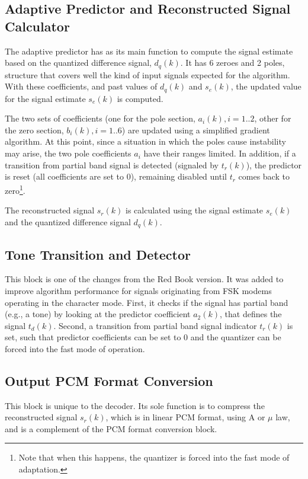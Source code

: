 \subsection{Adaptive Predictor and Reconstructed Signal Calculator}

The adaptive predictor has as its main function to compute the signal
estimate based on the quantized difference signal, $d_q(k)$. It has 6
zeroes and 2 poles, structure that covers well the kind of input
signals expected for the algorithm. With these coefficients, and past
values of $d_q(k)$ and $s_e(k)$, the updated value for the signal
estimate $s_e(k)$ is computed.

The two sets of coefficients (one for the pole section, $a_i(k),
i=1..2$, other for the zero section, $b_i(k), i=1..6$) are updated
using a simplified gradient algorithm. At this point, since a situation
in which the poles cause instability may arise, the two pole
coefficients $a_i$ have their ranges limited. In addition, if a
transition from partial band signal is detected (signaled by $t_r(k)$),
the predictor is reset (all coefficients are set to 0), remaining
disabled until $t_r$ comes back to zero\footnote{\SF Note that when
this happens, the quantizer is forced into the fast mode of
adaptation.}.

The reconstructed signal $s_r(k)$ is calculated using the signal
estimate $s_e(k)$ and the quantized difference signal $d_q(k)$.


\subsection{Tone Transition and Detector}

This block is one of the changes from the Red Book version. It was
added to improve algorithm performance for signals originating from
FSK modems operating in the character mode.  First, it checks if the
signal has partial band (e.g., a tone) by looking at the predictor
coefficient $a_2(k)$, that defines the signal $t_d(k)$.  Second, a
transition from partial band signal indicator $t_r(k)$ is set, such
that predictor coefficients can be set to 0 and the quantizer can be
forced into the fast mode of operation.

\subsection{Output PCM Format Conversion}

This block is unique to the decoder. Its sole function is to compress
the reconstructed signal $s_r(k)$, which is in linear PCM format, using
A or $\mu$ law, and is a complement of the PCM format conversion
block.


